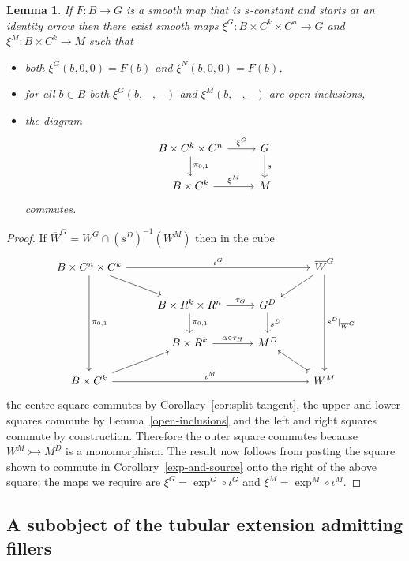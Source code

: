 \documentclass[pdftex]{sigma}
\numberwithin{equation}{section}
\newtheorem{Lemma}[Theorem]{Lemma}
\begin{document}
\begin{Lemma}If $F\colon B\rightarrow G$ is a smooth map that is $s$-constant and starts at an identity arrow then there exist smooth maps $\xi^G\colon B\times C^k\times C^n\rightarrow G$ and $\xi^M\colon B\times C^k\rightarrow M$ such that
\begin{itemize}\itemsep=0pt
\item both $\xi^G(b,0,0)=F(b)$ and $\xi^N(b,0,0)=F(b)$,
\item for all $b\in B$ both $\xi^G(b,-,-)$ and $\xi^M(b,-,-)$ are open inclusions,
\item the diagram
\begin{equation*}\begin{tikzcd}
B\times C^k\times C^n \dar{\pi_{0,1}} \rar{\xi^G} & G \dar{s}\\
B\times C^k \rar{\xi^M} & M
\end{tikzcd}\end{equation*}
commutes.
\end{itemize}
\end{Lemma}
\begin{proof} If $\overline{W}^G=W^G \cap (s^D)^{-1}(W^M)$ then in the cube
\begin{equation*}\begin{tikzcd}
B\times C^n\times C^k \drar \arrow{rrr}{\iota^G} \arrow{ddd}{\pi_{0,1}} &&& \overline{W}^G \dlar \arrow{ddd}{s^D|_{\overline{W}^G}}\\
&B\times R^k\times R^n \dar{\pi_{0,1}} \rar{\tau_G} & G^D \dar{s^D} &\\
& B\times R^k \rar{\alpha\circ\tau_H} & M^D &\\
B\times C^k \urar \arrow{rrr}{\iota^M} &&& W^M \ular[rightarrowtail]
\end{tikzcd}\end{equation*}
the centre square commutes by Corollary~\ref{cor:split-tangent}, the upper and lower squares commute by Lemma~\ref{open-inclusions} and the left and right squares commute by construction. Therefore the outer square commutes because~$W^M\rightarrowtail M^D$ is a monomorphism. The result now follows from \mbox{pasting} the square shown to commute in Corollary~\ref{exp-and-source} onto the right of the above square; the maps we require are $\xi^G = \exp^G\circ \iota^G$ and $\xi^M = \exp^M\circ\iota^M$.
\end{proof}

\subsection{A subobject of the tubular extension admitting f\/illers}\label{subobject-with-fillers}
\end{document}
